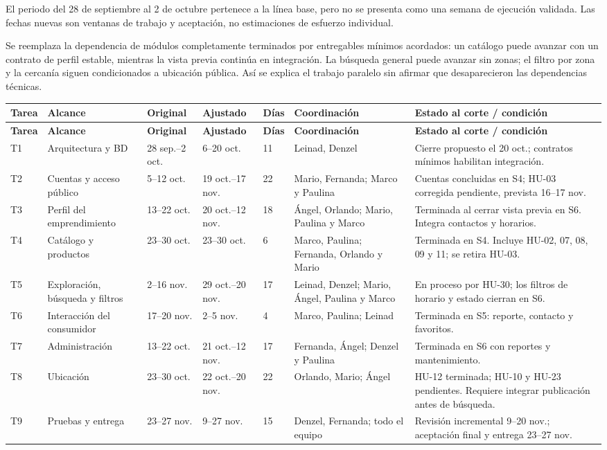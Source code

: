 El periodo del 28 de septiembre al 2 de octubre pertenece a la línea base,
pero no se presenta como una semana de ejecución validada. Las fechas nuevas
son ventanas de trabajo y aceptación, no estimaciones de esfuerzo individual.

Se reemplaza la dependencia de módulos completamente terminados por
entregables mínimos acordados: un catálogo puede avanzar con un contrato de
perfil estable, mientras la vista previa continúa en integración. La búsqueda
general puede avanzar sin zonas; el filtro por zona y la cercanía siguen
condicionados a ubicación pública. Así se explica el trabajo paralelo sin
afirmar que desaparecieron las dependencias técnicas.

\begingroup\scriptsize
\begin{longtable}{@{}L{0.9cm}L{2.4cm}L{1.8cm}L{2.0cm}L{0.7cm}L{3.3cm}L{4.5cm}@{}}
\textbf{Tarea}&\textbf{Alcance}&\textbf{Original}&
\textbf{Ajustado}&\textbf{Días}&\textbf{Coordinación}&\textbf{Estado al corte / condición}\\\midrule\endfirsthead
{}\textbf{Tarea}&\textbf{Alcance}&\textbf{Original}&
\textbf{Ajustado}&\textbf{Días}&\textbf{Coordinación}&\textbf{Estado al corte / condición}\\\midrule\endhead
\bottomrule\endfoot
T1 & Arquitectura y BD & 28 sep.--2 oct. & 6--20 oct. & 11 &
Leinad, Denzel & Cierre propuesto el 20 oct.; contratos mínimos habilitan integración. \\
T2 & Cuentas y acceso público & 5--12 oct. & 19 oct.--17 nov. & 22 &
Mario, Fernanda; Marco y Paulina & Cuentas concluidas en S4; HU-03 corregida pendiente, prevista 16--17 nov. \\
T3 & Perfil del emprendimiento & 13--22 oct. & 20 oct.--12 nov. & 18 &
Ángel, Orlando; Mario, Paulina y Marco & Terminada al cerrar vista previa en S6. Integra contactos y horarios. \\
T4 & Catálogo y productos & 23--30 oct. & 23--30 oct. & 6 &
Marco, Paulina; Fernanda, Orlando y Mario & Terminada en S4. Incluye HU-02, 07, 08, 09 y 11; se retira HU-03. \\
T5 & Exploración, búsqueda y filtros & 2--16 nov. & 29 oct.--20 nov. & 17 &
Leinad, Denzel; Mario, Ángel, Paulina y Marco & En proceso por HU-30; los filtros de horario y estado cierran en S6. \\
T6 & Interacción del consumidor & 17--20 nov. & 2--5 nov. & 4 &
Marco, Paulina; Leinad & Terminada en S5: reporte, contacto y favoritos. \\
T7 & Administración & 13--22 oct. & 21 oct.--12 nov. & 17 &
Fernanda, Ángel; Denzel y Paulina & Terminada en S6 con reportes y mantenimiento. \\
T8 & Ubicación & 23--30 oct. & 22 oct.--20 nov. & 22 &
Orlando, Mario; Ángel & HU-12 terminada; HU-10 y HU-23 pendientes. Requiere integrar publicación antes de búsqueda. \\
T9 & Pruebas y entrega & 23--27 nov. & 9--27 nov. & 15 &
Denzel, Fernanda; todo el equipo & Revisión incremental 9--20 nov.; aceptación final y entrega 23--27 nov. \\
\end{longtable}\endgroup

